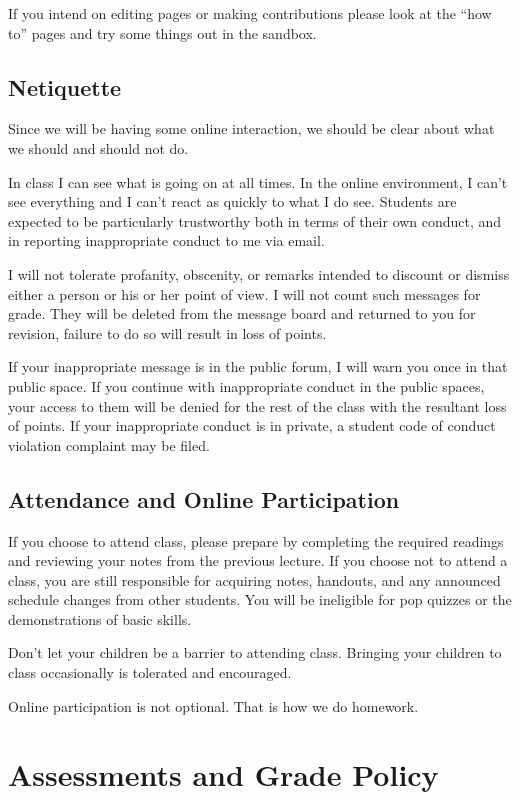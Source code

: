 \documentclass[letterpaper,10pt]{article}
\begin{document}
If you intend on editing pages or making contributions please look at
the ``how to'' pages and try some things out in the sandbox.

\subsection{Netiquette}
Since we will be having some online interaction, we should be clear
about what we should and should not do.

In class I can see what is going on at all times.  In the online
environment, I can't see everything and I can't react as quickly to
what I do see.  Students are expected to be particularly trustworthy
both in terms of their own conduct, and in reporting inappropriate
conduct to me via email.

I will not tolerate profanity, obscenity, or remarks intended to
discount or dismiss either a person or his or her point of view. I
will not count such messages for grade. They will be deleted from the
message board and returned to you for revision, failure to do so will
result in loss of points.

If your inappropriate message is in the public forum, I will warn you
once in that public space. If you continue with inappropriate conduct
in the public spaces, your access to them will be denied for the rest
of the class with the resultant loss of points. If your inappropriate
conduct is in private, a student code of conduct violation complaint
may be filed.

\subsection{Attendance and Online Participation}

If you choose to attend class, please prepare by
completing the required readings and reviewing your notes from the
previous lecture. If you choose not to attend a class, you are still
responsible for acquiring notes, handouts, and any announced schedule
changes from other students.  You will be ineligible for pop quizzes
or the demonstrations of basic skills.

Don't let your children be a barrier to attending class. Bringing your
children to class occasionally is tolerated and encouraged.

Online participation is not optional.  That is how we do homework.

\section{Assessments and Grade Policy}
\end{document}
